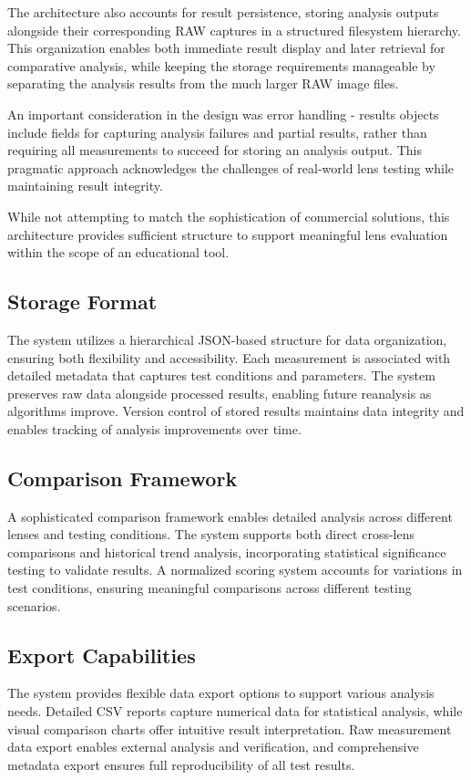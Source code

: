 The architecture also accounts for result persistence, storing analysis outputs alongside their corresponding RAW captures in a structured filesystem hierarchy. This organization enables both immediate result display and later retrieval for comparative analysis, while keeping the storage requirements manageable by separating the analysis results from the much larger RAW image files.

An important consideration in the design was error handling - results objects include fields for capturing analysis failures and partial results, rather than requiring all measurements to succeed for storing an analysis output. This pragmatic approach acknowledges the challenges of real-world lens testing while maintaining result integrity.

While not attempting to match the sophistication of commercial solutions, this architecture provides sufficient structure to support meaningful lens evaluation within the scope of an educational tool.

\subsection{Storage Format}
The system utilizes a hierarchical JSON-based structure for data organization, ensuring both flexibility and accessibility. Each measurement is associated with detailed metadata that captures test conditions and parameters. The system preserves raw data alongside processed results, enabling future reanalysis as algorithms improve. Version control of stored results maintains data integrity and enables tracking of analysis improvements over time.

\subsection{Comparison Framework}
A sophisticated comparison framework enables detailed analysis across different lenses and testing conditions. The system supports both direct cross-lens comparisons and historical trend analysis, incorporating statistical significance testing to validate results. A normalized scoring system accounts for variations in test conditions, ensuring meaningful comparisons across different testing scenarios.

\subsection{Export Capabilities}
The system provides flexible data export options to support various analysis needs. Detailed CSV reports capture numerical data for statistical analysis, while visual comparison charts offer intuitive result interpretation. Raw measurement data export enables external analysis and verification, and comprehensive metadata export ensures full reproducibility of all test results.

